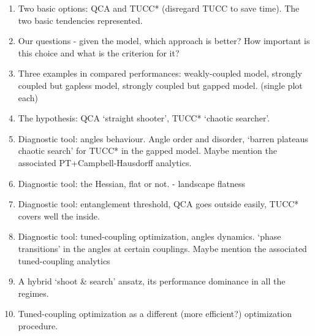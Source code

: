 \documentclass[10pt, a4paper]{article}
\begin{document}
\begin{enumerate}
\begin{enumerate}
	\item Two basic options: QCA and TUCC* (disregard TUCC to save time). The two basic tendencies represented.
	\item Our questions - given the model, which approach is better? How important is this choice and what is the criterion for it?
	\item Three examples in compared performances: weakly-coupled model, strongly coupled but gapless model, strongly coupled but gapped model. (single plot each)
	\item The hypothesis: QCA `straight shooter', TUCC* `chaotic searcher'.
	\item Diagnostic tool: angles behaviour. Angle order and disorder, `barren plateaus chaotic search' for TUCC* in the gapped model. Maybe mention the associated PT+Campbell-Hausdorff analytics.
	\item Diagnostic tool: the Hessian, flat or not. - landscape flatness
	\item Diagnostic tool: entanglement threshold, QCA goes outside easily, TUCC* covers well the inside.
	\item Diagnostic tool: tuned-coupling optimization, angles dynamics. `phase transitions' in the angles at certain couplings.  Maybe mention the associated tuned-coupling analytics
	\item A hybrid `shoot \& search' ansatz, its performance dominance in all the regimes.
	\item Tuned-coupling optimization as a different (more efficient?) optimization procedure.
\end{enumerate}

\end{enumerate}
\end{document}
